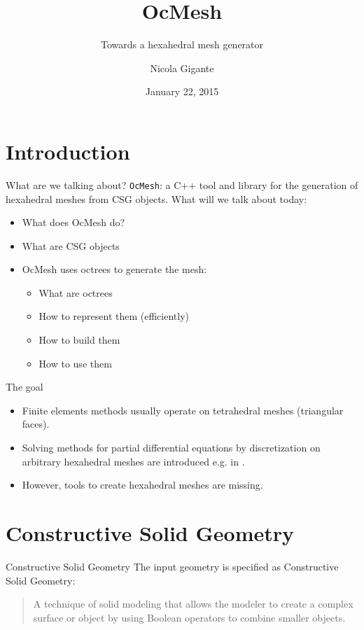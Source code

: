 \documentclass[utf8x]{beamer}
\title{OcMesh}
\subtitle{Towards a hexahedral mesh generator}
\author{Nicola Gigante}
\date{January 22, 2015}
\begin{document}
\begin{frame}
\maketitle
\end{frame}

\section{Introduction}
\begin{frame}[fragile]{What are we talking about?}
\verb|OcMesh|: a C++ tool and library for the generation of hexahedral meshes
from CSG objects.
\vfill
What will we talk about today:
\begin{itemize}
\item What does OcMesh do?
\item What are CSG objects
\item OcMesh uses octrees to generate the mesh:
      \begin{itemize}
      \item What are octrees
      \item How to represent them (efficiently)
      \item How to build them
      \item How to use them
      \end{itemize}
\end{itemize}
\end{frame}

\begin{frame}{The goal}
\begin{itemize}
\item Finite elements methods usually operate on tetrahedral meshes 
      (triangular faces).
\item Solving methods for partial differential equations by discretization on 
      arbitrary hexahedral meshes are introduced e.g. in \cite{Specogna2010}.
\item However, tools to create hexahedral meshes are missing.
\end{itemize}
\end{frame}

\section{Constructive Solid Geometry}
\begin{frame}{Constructive Solid Geometry}
The input geometry is specified as Constructive Solid Geometry:
\begin{quote}
A technique of solid modeling that allows the modeler to create a complex 
surface or object by using Boolean operators to combine smaller objects.
\end{quote}
\end{frame}
\end{document}
